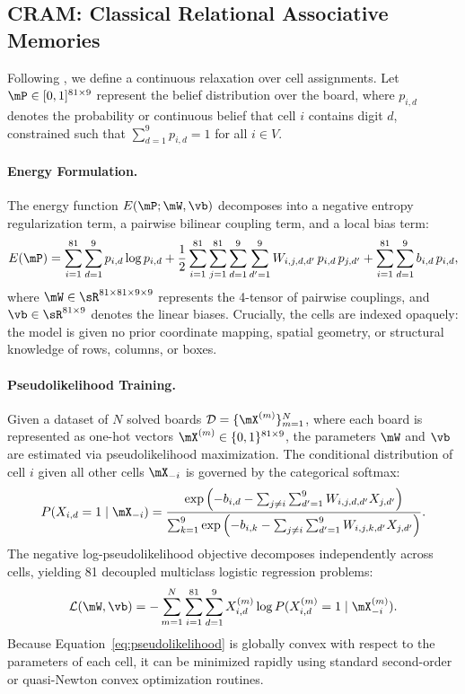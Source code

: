 \documentclass{article} %
\begin{document}
\subsection{CRAM: Classical Relational Associative Memories}
Following \citet{hoover2026classical}, we define a continuous relaxation over cell assignments. Let $\mP \in [0, 1]^{81 \times 9}$ represent the belief distribution over the board, where $p_{i, d}$ denotes the probability or continuous belief that cell $i$ contains digit $d$, constrained such that $\sum_{d=1}^9 p_{i, d} = 1$ for all $i \in V$.

\paragraph{Energy Formulation.}
The energy function $E(\mP; \mW, \vb)$ decomposes into a negative entropy regularization term, a pairwise bilinear coupling term, and a local bias term:
\begin{equation}
    E(\mP) = \sum_{i=1}^{81} \sum_{d=1}^9 p_{i, d} \log p_{i, d} + \frac{1}{2} \sum_{i=1}^{81} \sum_{j=1}^{81} \sum_{d=1}^9 \sum_{d'=1}^9 W_{i, j, d, d'} \, p_{i, d} \, p_{j, d'} + \sum_{i=1}^{81} \sum_{d=1}^9 b_{i, d} \, p_{i, d},
    \label{eq:cram_energy}
\end{equation}
where $\mW \in \sR^{81 \times 81 \times 9 \times 9}$ represents the 4-tensor of pairwise couplings, and $\vb \in \sR^{81 \times 9}$ denotes the linear biases. Crucially, the cells are indexed opaquely: the model is given no prior coordinate mapping, spatial geometry, or structural knowledge of rows, columns, or boxes.

\paragraph{Pseudolikelihood Training.}
Given a dataset of $N$ solved boards $\mathcal{D} = \{\mX^{(m)}\}_{m=1}^N$, where each board is represented as one-hot vectors $\mX^{(m)} \in \{0, 1\}^{81 \times 9}$, the parameters $\mW$ and $\vb$ are estimated via pseudolikelihood maximization. The conditional distribution of cell $i$ given all other cells $\mX_{-i}$ is governed by the categorical softmax:
\begin{equation}
    P(X_{i, d} = 1 \mid \mX_{-i}) = \frac{\exp\left( - b_{i, d} - \sum_{j \neq i} \sum_{d'=1}^9 W_{i, j, d, d'} X_{j, d'} \right)}{\sum_{k=1}^9 \exp\left( - b_{i, k} - \sum_{j \neq i} \sum_{d'=1}^9 W_{i, j, k, d'} X_{j, d'} \right)}.
\end{equation}
The negative log-pseudolikelihood objective decomposes independently across cells, yielding 81 decoupled multiclass logistic regression problems:
\begin{equation}
    \mathcal{L}(\mW, \vb) = - \sum_{m=1}^N \sum_{i=1}^{81} \sum_{d=1}^9 X_{i, d}^{(m)} \log P(X_{i, d}^{(m)} = 1 \mid \mX_{-i}^{(m)}).
    \label{eq:pseudolikelihood}
\end{equation}
Because Equation~\ref{eq:pseudolikelihood} is globally convex with respect to the parameters of each cell, it can be minimized rapidly using standard second-order or quasi-Newton convex optimization routines.
\end{document}
